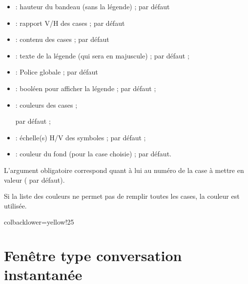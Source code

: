 \documentclass[french,11pt,a4paper]{article}
\begin{document}
\begin{itemize}
	\item {} : hauteur du bandeau (sans la légende) ;  par défaut
	\item {} : rapport V/H des cases ;  par défaut
	\item {} : contenu des cases ;  par défaut
	\item {} : texte de la légende (qui sera en majuscule) ;  par défaut ;
	\item {} : Police globale ;  par défaut
	\item {} : booléen pour afficher la légende ;   par défaut ;
	\item {} : couleurs des cases ;
	
	\hfill{} par défaut ;
	\item {} : échelle(s) H/V des symboles ;   par défaut ;
	\item {} : couleur du fond (pour la case choisie)  ;   par défaut.
\end{itemize}

L'argument obligatoire correspond quant à lui au numéro de la case à mettre en valeur ( par défaut).

\smallskip

Si la liste des couleurs ne permet pas de remplir toutes les cases, la couleur  est utilisée.

\begin{DemoCode}{}
\end{DemoCode}

\begin{DemoCode}{colbacklower=yellow!25}
\def\lstcouleurs{couleurNS1,couleurNS2,couleurNS3,couleurNS4,couleurNS5,purple}
\BandeauScore%
	[EchelleSymboles={1.33,2},Hauteur=2,AffLegende=false,
	Symboles={1,2,3,4,5,6},Couleurs=\lstcouleurs,
	CouleurFond=yellow!25]{1}
\end{DemoCode}

\pagebreak

\section{Fenêtre type conversation instantanée}
\end{document}
